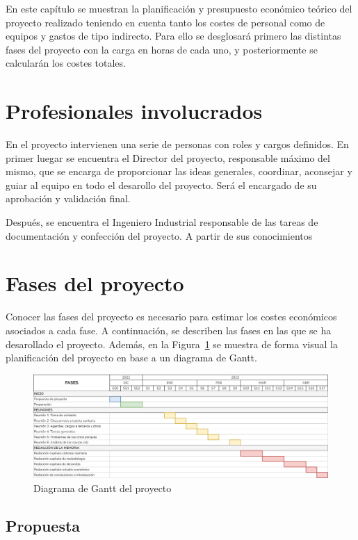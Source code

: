 En este capítulo se muestran la planificación y presupuesto económico teórico del proyecto realizado teniendo en cuenta tanto los costes de personal como de equipos y gastos de tipo indirecto. Para ello se desglosará primero las distintas fases del proyecto con la carga en horas de cada uno, y posteriormente se calcularán los costes totales.

\section{Profesionales involucrados}

En el proyecto intervienen una serie de personas con roles y cargos definidos.
En primer luegar se encuentra el Director del proyecto, responsable máximo del mismo, que se encarga de proporcionar las ideas generales, coordinar, aconsejar y guiar al equipo en todo el desarollo del proyecto.
Será el encargado de su aprobación y validación final.

Después, se encuentra el Ingeniero Industrial responsable de las tareas de documentación y confección del proyecto. A partir de sus conocimientos 

\section{Fases del proyecto}

Conocer las fases del proyecto es necesario para estimar los costes económicos asociados a cada fase.
A continuación, se describen las fases en las que se ha desarollado el proyecto.
Además, en la Figura~\ref{fig:gantt} se muestra de forma visual la planificación del proyecto en base a un diagrama de Gantt.

\begin{figure}[H]
    \centering
    \includegraphics[width=\textwidth]{img/gantt-diagram.png}
    \caption{Diagrama de Gantt del proyecto}
    \label{fig:gantt}
\end{figure}

\subsection{Propuesta}

